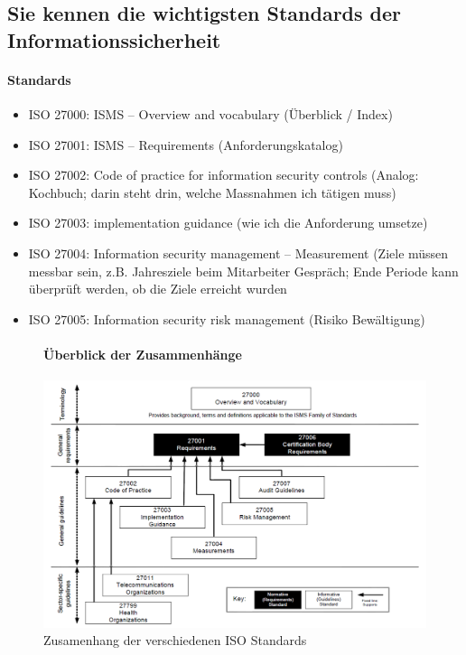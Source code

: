 \documentclass[10pt,a4paper]{article}
\begin{document}
\subsection*{Sie kennen die wichtigsten Standards der Informationssicherheit}
\paragraph*{Standards}
\begin{itemize}[noitemsep,topsep=0pt,leftmargin=*]
    \item ISO 27000: ISMS – Overview and vocabulary (Überblick / Index)
    \item ISO 27001: ISMS – Requirements (Anforderungskatalog)
    \item ISO 27002: Code of practice for information security controls (Analog: Kochbuch; darin steht drin, welche Massnahmen ich tätigen muss)
    \item ISO 27003: implementation guidance (wie ich die Anforderung umsetze)
    \item ISO 27004: Information security management – Measurement (Ziele müssen messbar sein, z.B. Jahresziele beim Mitarbeiter Gespräch; Ende Periode kann überprüft werden, ob die Ziele erreicht wurden
    \item ISO 27005: Information security risk management (Risiko Bewältigung)
\end{itemize}

\begin{figure}[H]
\paragraph*{Überblick der Zusammenhänge}
    \begin{center}
    \includegraphics[width=16cm]{images/iso27000.png}
    \caption{Zusamenhang der verschiedenen ISO Standards \cite{iso27000}}
    \label{iso27000}
    \end{center}
\end{figure}
\end{document}
